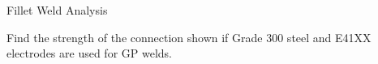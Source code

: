 %
\begin{exmp}
Fillet Weld Analysis

Find the strength of the connection shown if Grade 300 steel and E41XX electrodes are used for GP welds.
\begin{figure}[H]

\end{figure}
\end{exmp}
